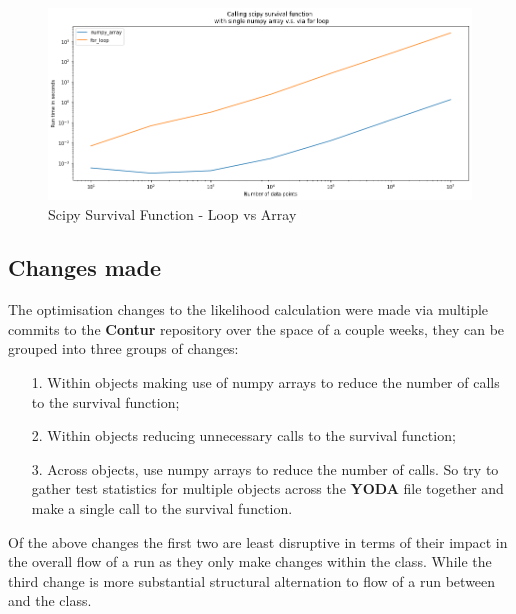 \begin{figure}[H]
\centering
\includegraphics[scale=0.5]{plots/scipy_profile.png}
\caption{Scipy Survival Function - Loop vs Array}
\label{fig:loop_v_array}
\end{figure} 

\subsection{Changes made}
The optimisation changes to the likelihood calculation were made via multiple commits to the \textbf{Contur} repository over the space of a couple weeks, they can be grouped into three groups of changes:

\begin{itemize}
\item[1.] Within  objects making use of numpy arrays to reduce the number of calls to the survival function;
\item[2.] Within  objects reducing unnecessary calls to the survival function;
\item[3.] Across  objects, use numpy arrays to reduce the number of calls. So try to gather test statistics for multiple  objects across the \textbf{YODA} file together and make a single call to the survival function.
\end{itemize}

Of the above changes the first two are least disruptive in terms of their impact in the overall flow of a run as they only make changes within the  class. While the third change is more substantial structural alternation to flow of a run between  and the  class.

